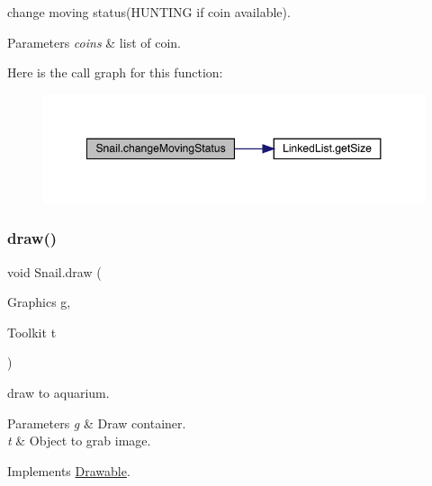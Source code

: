 change moving status(\+H\+U\+N\+T\+I\+N\+G if coin available). 
\begin{DoxyParams}{Parameters}
{\em coins} & list of coin. \\
\hline
\end{DoxyParams}
Here is the call graph for this function\+:
\nopagebreak
\begin{figure}[H]
\begin{center}
\leavevmode
\includegraphics[width=348pt]{class_snail_a1ac3de4bd120dcfeae9ccc66918057e5_cgraph}
\end{center}
\end{figure}
\mbox{\label{class_snail_aa39dc71c305e7034af0438f036232e43}} 
\subsubsection{\texorpdfstring{draw()}{draw()}}
{\footnotesize\ttfamily void Snail.\+draw (\begin{DoxyParamCaption}\item[{Graphics}]{g,  }\item[{Toolkit}]{t }\end{DoxyParamCaption})\hspace{0.3cm}{\ttfamily [inline]}}

draw to aquarium. 
\begin{DoxyParams}{Parameters}
{\em g} & Draw container. \\
\hline
{\em t} & Object to grab image. \\
\hline
\end{DoxyParams}


Implements \mbox{\hyperlink{interface_drawable_aaddafb212b3c8e60fcc742052570c893}{Drawable}}.

